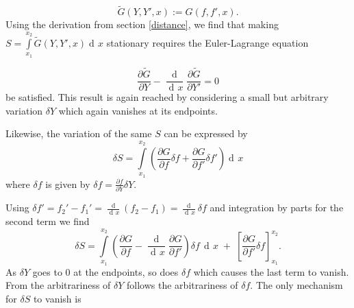 \documentclass[prb,preprint]{revtex4-1}
\DeclareMathOperator{\dd}{d\!}
\DeclareMathOperator{\ddd}{\mathrm{d}}
\begin{document}
\begin{equation} \label{lagrangian-transform}
\widetilde{G}(Y,Y',x) := G(f,f',x).
\end{equation}
Using the derivation from section \ref{distance}, we find that making $S = \int\limits_{x_1}^{x_2} \widetilde{G}(Y,Y',x) \dd x$ stationary requires the Euler-Lagrange equation

\begin{equation}
\frac{\partial \widetilde{G}}{\partial Y}
- \frac{\ddd}{\dd x}\frac{\partial \widetilde{G}}{\partial Y'} = 0
\end{equation}
be satisfied. This result is again reached by considering a small but arbitrary variation $\delta Y$ which again vanishes at its endpoints.

Likewise, the variation of the same $S$ can be expressed by
\begin{equation}
\delta S = \int\limits_{x_1}^{x_2} \left( \frac{\partial G}{\partial f} \delta f
+ \frac{\partial G}{\partial f'} \delta f' \right) \dd x
\end{equation}
where $\delta f$ is given by $\delta f = \frac{\partial f}{\partial Y} \delta Y$.


Using $\delta f' = f_2' - f_1' = \frac{\ddd}{\dd x}(f_2 - f_1) = \frac{\dd}{\dd x} \delta f$ and integration by parts for the second term we find
\begin{equation}
\delta S = \int\limits_{x_1}^{x_2} \left( \frac{\partial G}{\partial f}
- \frac{\ddd}{\dd x} \frac{\partial G}{\partial f'} \right) \delta f \, \dd x \;
+ \; \left[\frac{\partial G}{\partial f'} \delta f \right]_{x_1}^{x_2}.
\end{equation}
As $\delta Y$ goes to $0$ at the endpoints, so does $\delta f$ which causes the last term to vanish. From the arbitrariness of $\delta Y$ follows the arbitrariness of $\delta f$. The only mechanism for $\delta S$ to vanish is
\end{document}
